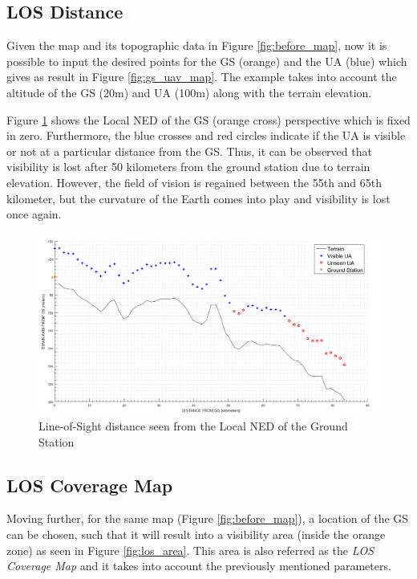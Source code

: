 \subsection{LOS Distance}
Given the map and its topographic data in Figure \ref{fig:before_map}, now it is possible to input the desired points for the GS (orange) and the UA (blue) which gives as result in Figure \ref{fig:gs_uav_map}. The example takes into account the altitude of the GS (20m) and UA (100m) along with the terrain elevation. 

Figure \ref{fig:los_2p} shows the Local NED of the GS (orange cross) perspective which is fixed in zero. Furthermore, the blue crosses and red circles indicate if the UA is visible or not at a particular distance from the GS. Thus, it can be observed that visibility is lost after 50 kilometers from the ground station due to terrain elevation. However, the field of vision is regained between the 55th and 65th kilometer, but the curvature of the Earth comes into play and visibility is lost once again.

\begin{figure}[H]
	\centering
	\includegraphics[scale=0.40]{figures/los_2points.png}
	\caption{Line-of-Sight distance seen from the Local NED of the Ground Station}
   	\label{fig:los_2p}
\end{figure}

\subsection{LOS Coverage Map}
Moving further, for the same map (Figure \ref{fig:before_map}), a location of the GS can be chosen, such that it will result into a visibility area (inside the orange zone) as seen in Figure \ref{fig:los_area}. This area is also referred as the \emph{LOS Coverage Map} and it takes into account the previously mentioned parameters.

